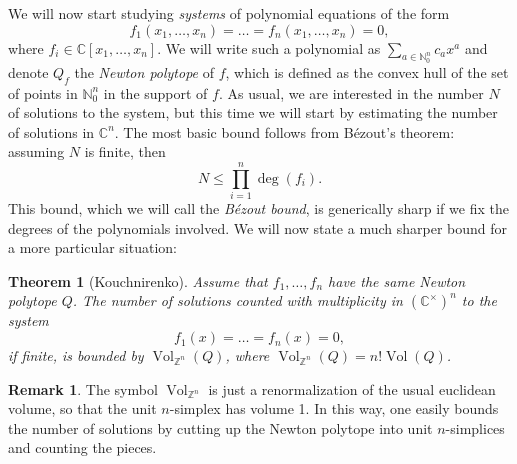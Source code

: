 \documentclass[11pt, a4paper]{article}
\newcommand{\NN}{\mathbb{N}}
\newcommand{\ZZ}{\mathbb{Z}}
\newcommand{\CC}{\mathbb{C}}
\DeclareMathOperator{\Vol}{Vol}
\theoremstyle{plain}
\newtheorem{thm}[prop]{Theorem}
\theoremstyle{definition}
\newtheorem{rem}[prop]{Remark}
\begin{document}
We will now start studying \emph{systems} of polynomial equations of the form
\[f_1(x_1,\dots,x_n)=\dots=f_n(x_1,\dots,x_n)=0,\]
where $f_i\in \CC[x_1,\dots,x_n]$. We will write such a polynomial as $\sum_{a\in \NN_0^n} c_a x^a$ and denote $Q_f$ the \emph{Newton polytope} of $f$, which is defined as the convex hull of the set of points in $\NN_0^n$ in the support of $f$. As usual, we are interested in the number $N$ of solutions to the system, but this time we will start by estimating the number of solutions in $\CC^n$. The most basic bound follows from Bézout's theorem: assuming $N$ is finite, then
\[N\leq \prod_{i=1}^n \deg(f_i).\]
This bound, which we will call the \emph{Bézout bound}, is generically sharp if we fix the degrees of the polynomials involved. We will now state a much sharper bound for a more particular situation:
\begin{thm}[Kouchnirenko] Assume that $f_1,\dots,f_n$ have the same Newton polytope $Q$. The number of solutions counted with multiplicity in $(\CC^\times)^n$ to the system
\[f_1(x)=\dots=f_n(x)=0,\]
if finite, is bounded by $\Vol_{\ZZ^n}(Q)$, where $\Vol_{\ZZ^n}(Q) = n! \Vol(Q)$.
\end{thm}
\begin{rem} The symbol $\Vol_{\ZZ^n}$ is just a renormalization of the usual euclidean volume, so that the unit $n$-simplex has volume 1. In this way, one easily bounds the number of solutions by cutting up the Newton polytope into unit $n$-simplices and counting the pieces.
\end{rem}
\end{document}
